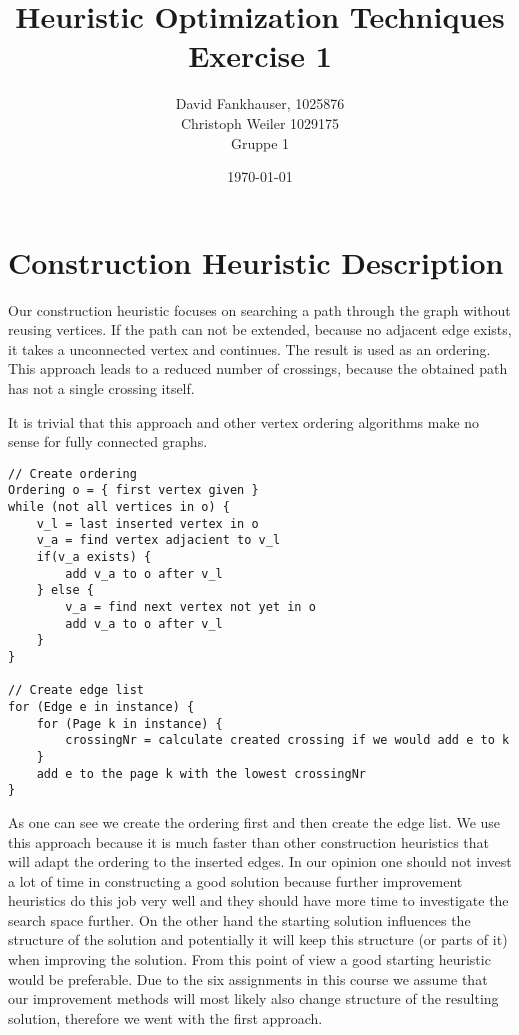 \documentclass[11pt]{article}
\title{\textbf{Heuristic Optimization Techniques }\\Exercise 1}
\author{David Fankhauser, 1025876\\ Christoph Weiler 1029175\\Gruppe 1}
\date{\today}
\begin{document}
\lstset{language=C++}
\maketitle
 
\section{Construction Heuristic Description}
Our construction heuristic focuses on searching a path through the graph without reusing vertices. If the path can not be extended, because no adjacent edge exists, it takes a unconnected vertex and continues. The result is used as an ordering.
This approach leads to a reduced number of crossings, because the obtained path has not a single crossing itself.

It is trivial that this approach and other vertex ordering algorithms make no sense for fully connected graphs.

\begin{lstlisting}[frame=single]
// Create ordering
Ordering o = { first vertex given }
while (not all vertices in o) {
    v_l = last inserted vertex in o
    v_a = find vertex adjacient to v_l
    if(v_a exists) {
    	add v_a to o after v_l
    } else {
    	v_a = find next vertex not yet in o
        add v_a to o after v_l
    }
}

// Create edge list
for (Edge e in instance) {
    for (Page k in instance) {
        crossingNr = calculate created crossing if we would add e to k
    }
    add e to the page k with the lowest crossingNr
}
\end{lstlisting}

As one can see we create the ordering first and then create the edge list.
We use this approach because it is much faster than other construction heuristics that will adapt the ordering to the inserted edges.
In our opinion one should not invest a lot of time in constructing a good solution because further improvement heuristics do this job very well and they should have more time to investigate the search space further.
On the other hand the starting solution influences the structure of the solution and potentially it will keep this structure (or parts of it) when improving the solution. From this point of view a good starting heuristic would be preferable.
Due to the six assignments in this course we assume that our improvement methods will most likely also change structure of the resulting solution, therefore we went with the first approach.
\end{document}
